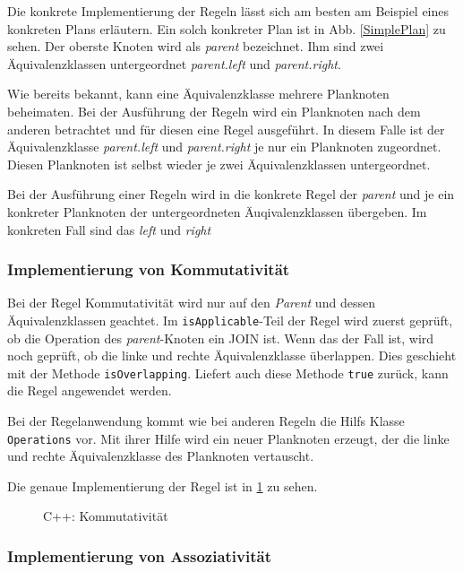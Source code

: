Die konkrete Implementierung der Regeln lässt sich am besten am Beispiel eines konkreten Plans erläutern. Ein solch konkreter Plan ist in Abb. \ref{SimplePlan} zu sehen. Der oberste Knoten wird als \textit{parent} bezeichnet. Ihm sind zwei Äquivalenzklassen untergeordnet \textit{parent.left} und \textit{parent.right}. 

Wie bereits bekannt, kann eine Äquivalenzklasse mehrere Planknoten beheimaten. Bei der Ausführung der Regeln wird ein Planknoten nach dem anderen betrachtet und für diesen eine Regel ausgeführt. In diesem Falle ist der Äquivalenzklasse \textit{parent.left} und \textit{parent.right} je nur ein Planknoten zugeordnet. Diesen Planknoten ist selbst wieder je zwei Äquivalenzklassen untergeordnet.


Bei der Ausführung einer Regeln wird in die konkrete Regel der \textit{parent} und je ein konkreter Planknoten der untergeordneten Äuqivalenzklassen übergeben. Im konkreten Fall sind das \textit{left} und \textit{right}





\subsubsection{Implementierung von Kommutativität}

Bei der Regel Kommutativität wird nur auf den \textit{Parent} und dessen Äquivalenzklassen geachtet. Im \texttt{isApplicable}-Teil der Regel wird zuerst geprüft, ob die Operation des \textit{parent}-Knoten ein JOIN ist. Wenn das der Fall ist, wird noch geprüft, ob die linke und rechte Äquivalenzklasse überlappen. Dies geschieht mit der Methode \texttt{isOverlapping}. Liefert auch diese Methode \texttt{true} zurück, kann die Regel angewendet werden.

Bei der Regelanwendung kommt wie bei anderen Regeln die Hilfs Klasse \texttt{Operations} vor. Mit ihrer Hilfe wird ein neuer Planknoten erzeugt, der die linke und rechte Äquivalenzklasse des Planknoten vertauscht.

Die genaue Implementierung der Regel ist in \ref{CommutativityCode} zu sehen.


\begin{figure}[ht]

\caption{C++: Kommutativität}
\label{CommutativityCode}
\end{figure}




\subsubsection{Implementierung von Assoziativität}

